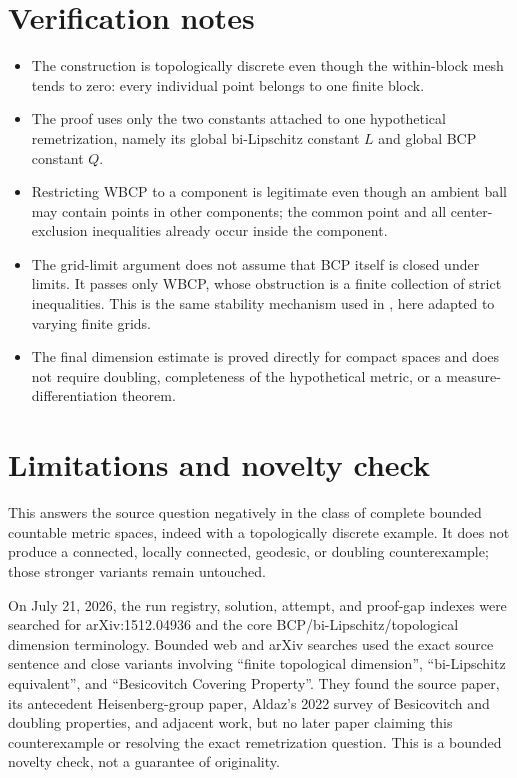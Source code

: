 \documentclass[11pt]{article}
\begin{document}
\section{Verification notes}

\begin{itemize}
\item The construction is topologically discrete even though the within-block
      mesh tends to zero: every individual point belongs to one finite block.
\item The proof uses only the two constants attached to one hypothetical
      remetrization, namely its global bi-Lipschitz constant $L$ and global BCP
      constant $Q$.
\item Restricting WBCP to a component is legitimate even though an ambient
      ball may contain points in other components; the common point and all
      center-exclusion inequalities already occur inside the component.
\item The grid-limit argument does not assume that BCP itself is closed under
      limits.  It passes only WBCP, whose obstruction is a finite collection
      of strict inequalities.  This is the same stability mechanism used in
      \cite[Lemma 7.7]{LeDonneRigot}, here adapted to varying finite grids.
\item The final dimension estimate is proved directly for compact spaces and
      does not require doubling, completeness of the hypothetical metric, or
      a measure-differentiation theorem.
\end{itemize}

\section{Limitations and novelty check}

This answers the source question negatively in the class of complete bounded
countable metric spaces, indeed with a topologically discrete example.  It
does not produce a connected, locally connected, geodesic, or doubling
counterexample; those stronger variants remain untouched.

On July 21, 2026, the run registry, solution, attempt, and proof-gap indexes
were searched for arXiv:1512.04936 and the core BCP/bi-Lipschitz/topological
dimension terminology.  Bounded web and arXiv searches used the exact source
sentence and close variants involving ``finite topological dimension'',
``bi-Lipschitz equivalent'', and ``Besicovitch Covering Property''.  They found
the source paper, its antecedent Heisenberg-group paper, Aldaz's 2022 survey of
Besicovitch and doubling properties, and adjacent work, but no later paper
claiming this counterexample or resolving the exact remetrization question.
This is a bounded novelty check, not a guarantee of originality.
\end{document}
